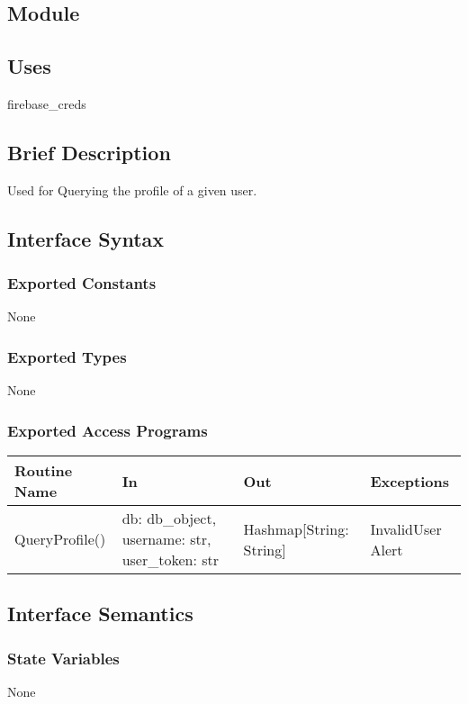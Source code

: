 \documentclass[12pt, titlepage]{article}
\begin{document}
\subsection*{Module}

\subsection* {Uses}
firebase\_creds

\subsection* {Brief Description}
Used for Querying the profile of a given user.

\subsection* {Interface Syntax}
\subsubsection* {Exported Constants}
None

\subsubsection* {Exported Types}
None

\subsubsection* {Exported Access Programs}
\begin{table}[!htb]
    \centering
    \begin{tabular}{|p{3cm}|p{3cm}|p{3cm}|p{4.5cm}|}
        \hline
        \textbf{Routine Name} & \textbf{In} & \textbf{Out} & \textbf{Exceptions} \\
        \hline
         QueryProfile() & db: db\_object, username: str, user\_token: str  & Hashmap[String: String] & InvalidUser Alert\\
        \hline
    \end{tabular}
\end{table}

\subsection{Interface Semantics}
\subsubsection{State Variables}
None
\end{document}

